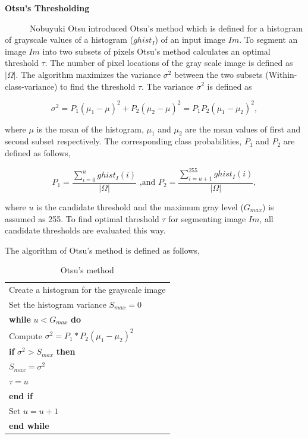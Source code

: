 \documentclass{article}
\begin{document}
\textbf{Otsu's Thresholding}

~~~~~~Nobuyuki Otsu introduced Otsu's method which is defined for a
histogram of grayscale values of a histogram (\(ghist_I\)) of an input
image \(Im\). To segment an image \(Im\) into two subsets of pixels
Otsu's method calculates an optimal threshold \(\tau\). The number of
pixel locations of the gray scale image is defined as \(|\Omega|\). The
algorithm maximizes the variance \(\sigma^2\) between the two subsets
(Within-class-variance) to find the threshold \(\tau\). The variance
\(\sigma^2\) is defined as

\[\sigma^2 = P_1(\mu_1-\mu)^2 + P_2(\mu_2-\mu)^2 = P_1P_2(\mu_1-\mu_2)^2, \]

where \(\mu\) is the mean of the histogram, \(\mu_1\) and \(\mu_2\) are
the mean values of first and second subset respectively. The
corresponding class probabilities, \(P_1\) and \(P_2\) are defined as
follows,

\[P_1 = \frac{\sum_{i=0}^{u}ghist_I(i)}{|\Omega|} \text{ ,and } P_2 = \frac{\sum_{i=u+1}^{255}ghist_I(i)}{|\Omega|},\]

where \(u\) is the candidate threshold and the maximum gray level
(\(G_{max}\)) is assumed as 255. To find optimal threshold \(\tau\) for
segmenting image \(Im\), all candidate thresholds are evaluated this
way.

The algorithm of Otsu's method is defined as follows,

\begin{table}[!ht]
\centering
\begin{tabular}{l}
\hline
Create a histogram for the grayscale image \\ 
Set the histogram variance $S_{max} = 0$                                             \\ \hline
\textbf{while} $u < G_{max}$ \textbf{do}                                             \\ \hline
Compute $\sigma^2 = P_1*P_2(\mu_1-\mu_2)^2$                                             \\ 
\textbf{if} $\sigma^2 > S_{max}$ \textbf{then}                                             \\ \hline
$S_{max} = \sigma^2$                                             \\
$\tau = u$                                             \\ \hline
\textbf{end if}                                             \\ 
Set $u = u+1$                                             \\ \hline
\textbf{end while}                                             \\ \hline
\end{tabular}
\caption{Otsu's method}
\label{tab:ot}
\end{table}
\end{document}
